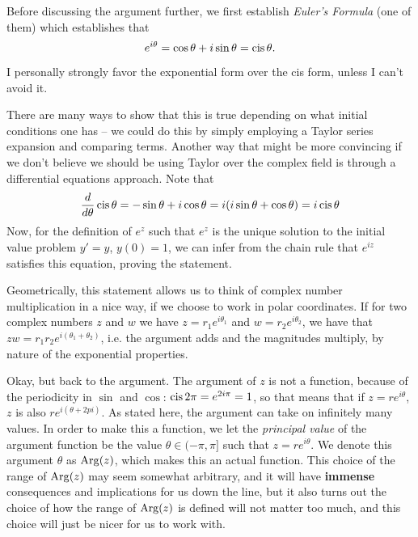 \documentclass[12pt]{scrartcl}
\begin{document}
Before discussing the argument further, we first establish \textit{Euler's Formula} (one of them) which establishes that
\[
	e^{i\theta} = \cos \theta + i \sin \theta = \operatorname{cis} \theta.
\]
I personally strongly favor the exponential form over the cis form, unless I can't avoid it.

There are many ways to show that this is true depending on what initial conditions one has -- we could do this by simply employing a Taylor series expansion and comparing terms. Another way that might be more convincing if we don't believe we should be using Taylor over the complex field is through a differential equations approach. Note that
\[
	\frac{d }{d \theta} \operatorname{cis} \theta = -\sin \theta + i \cos \theta = i(i \sin \theta + \cos \theta) = i \operatorname{cis} \theta
\]
Now, for the definition of $e^z$ such that $e^z$ is the unique solution to the initial value problem $y' = y$, $y(0) = 1$, we can infer from the chain rule that $e^{iz}$ satisfies this equation, proving the statement.

Geometrically, this statement allows us to think of complex number multiplication in a nice way, if we choose to work in polar coordinates. If for two complex numbers $z$ and $w$ we have $z = r_1 e^{i\theta_1}$ and $w = r_2 e^{i\theta_2}$, we have that $zw = r_1 r_2 e^{i (\theta_1 + \theta_2)}$, i.e. the argument adds and the magnitudes multiply, by nature of the exponential properties.

Okay, but back to the argument. The argument of $z$ is not a function, because of the periodicity in $\sin$ and $\cos$: $\operatorname{cis} 2\pi = e^{2i \pi} = 1$, so that means that if $z = re^{i\theta}$, $z$ is also $re^{i(\theta + 2pi)}$. As stated here, the argument can take on infinitely many values. In order to make this a function, we let the \textit{principal value} of the argument function be the value $\theta \in (-\pi, \pi]$ such that $z = re^{i\theta}$. We denote this argument $\theta$ as $\operatorname*{Arg}(z)$, which makes this an actual function. This choice of the range of $\operatorname*{Arg}(z)$ may seem somewhat arbitrary, and it will have \textbf{immense} consequences and implications for us down the line, but it also turns out the choice of how the range of $\operatorname*{Arg}(z)$ is defined will not matter too much, and this choice will just be nicer for us to work with.
\end{document}
